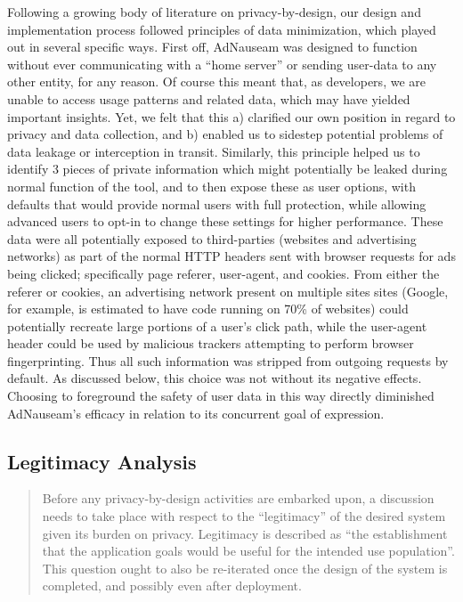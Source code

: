\documentclass[conference]{IEEEtran}
\begin{document}
Following a growing body of literature on privacy-by-design\cite{Gurses-0, Hoepman, Gurses-1, Hansen, Cavoukian}, our design and implementation process followed principles of data minimization, which played out in several specific ways. First off, AdNauseam was designed to function without ever communicating with a “home server” or sending user-data to any other entity, for any reason. Of course this meant that, as developers, we are unable to access usage patterns and related data, which may have yielded important insights. Yet, we felt that this a) clarified our own position in regard to privacy and data collection, and b) enabled us to sidestep potential problems of data leakage or interception in transit. Similarly, this principle helped us to identify 3 pieces of private information which might potentially be leaked during normal function of the tool, and to then expose these as user options, with defaults that would provide normal users with full protection, while allowing advanced users to opt-in to change these settings for higher performance. These data were all potentially exposed to third-parties (websites and advertising networks) as part of the normal HTTP headers sent with browser requests for ads being clicked; specifically page referer, user-agent, and cookies. From either the referer or cookies, an advertising network present on multiple sites sites (Google, for example, is estimated to have code running on 70\% of websites\cite{Englehardt}) could potentially recreate large portions of a user's click path, while the user-agent header could be used by malicious trackers attempting to perform browser fingerprinting\cite{Nikiforakis}. Thus all such information was stripped from outgoing requests by default. As discussed below, this choice was not without its negative effects. Choosing to foreground the safety of user data in this way directly diminished AdNauseam's efficacy in relation to its concurrent goal of expression.

\subsection{Legitimacy Analysis}

\blockquote{Before any privacy-by-design activities are embarked upon, a discussion needs to take place with respect to the “legitimacy” of the desired system given its burden on privacy. Legitimacy is described as “the establishment that the application goals would be useful for the intended use population”. This question ought to also be re-iterated once the design of the system is completed, and possibly even after deployment.\cite{Iachello}}
\end{document}
